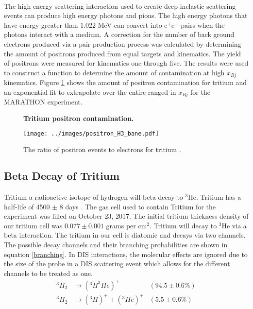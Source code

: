 \paragraph{} The high energy scattering interaction used to create deep inelastic scattering events can produce high energy photons and pions. The high energy photons that have energy greater than 1.022 MeV can convert into e$^+$e$^-$ pairs when the photons interact with a medium.   
A correction for the number of back ground electrons produced via a pair production process was calculated by determining the amount of positrons produced from equal targets and kinematics. The yield of positrons were measured for kinematics one through five. The results were used to construct a function to determine the amount of contamination at high $x_{Bj}$ kinematics. Figure \ref{PC} shows the amount of positron contamination for tritium and an exponential fit to extrapolate over the entire ranged in $x_{Bj}$ for the MARATHON experiment. 

\begin{figure}[h]
	\centering
	\textbf{Tritium positron contamination. }\par\medskip
	\texttt{[image: ../images/positron\_H3\_bane.pdf]}
	\caption{The ratio of positron events to electrons for tritium \cite{tongsu}. }
	\label{PC}
\end{figure}


\subsection{Beta Decay of Tritium}
\paragraph{} Tritium a radioactive isotope of hydrogen will beta decay to $^3$He. Tritium has a half-life of 4500 $\pm$ 8 days \cite{T2HL}. The gas cell used to contain Tritium for the experiment was filled on October 23, 2017. The initial tritium thickness density of our tritium cell was $0.077 \pm 0.001 $ grams per cm$^2$. Tritium will decay to $^3$He via a beta interaction. The tritium in our cell is diatomic and decays via two channels\cite{diaT}. The possible decay channels and their branching probabilities are shown in equation \ref{branching}. In DIS interactions, the molecular effects are ignored due to the size of the probe in a DIS scattering event which allows for the different channels to be treated as one. 
\begin{align}
			^3H_2 &\rightarrow(^3H ^3He)^+  &(94.5 \pm 0.6\%) \nonumber \\ 
			^3H_2 &\rightarrow(^3H)^+ + (^3He)^+  & (5.5 \pm 0.6\%) 
			\label{branching}
\end{align}
